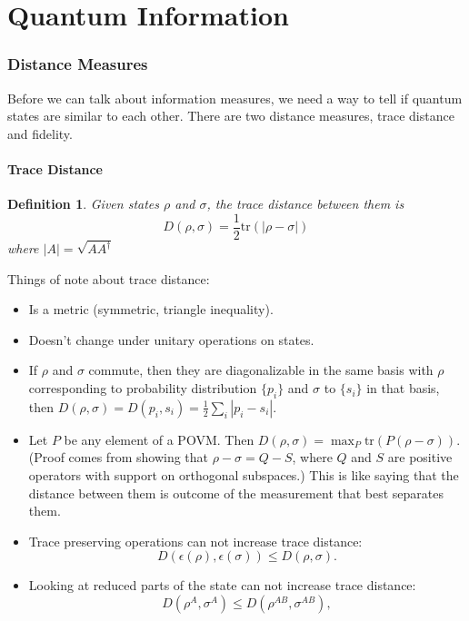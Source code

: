 \documentclass[12pt]{article}
\newtheorem{define}[theorem]{Definition}
\begin{document}
\part{Quantum Information}
\setcounter{section}{0}
\section{Distance Measures}
Before we can talk about information measures, we need a way to tell if quantum states are similar to each other. There are two distance measures, 
trace distance and fidelity.

\subsection{Trace Distance}
\begin{define} Given states $\rho$ and $\sigma$, the trace distance between them is
$$ D(\rho,\sigma)=\frac{1}{2}\text{tr}(|\rho-\sigma|)$$
where $|A|=\sqrt{AA^\dagger}$
\end{define}
Things of note about trace distance:
\begin{itemize}
\item Is a metric (symmetric, triangle inequality).
\item Doesn't change under unitary operations on states.
\item If $\rho$ and $\sigma$ commute, then they are diagonalizable in the same basis with $\rho$ corresponding to probability 
distribution $\{p_i\}$ and $\sigma$ to $\{s_i\}$ in that basis, then $D(\rho,\sigma)=D(p_i,s_i)=\frac{1}{2}\sum_i|p_i-s_i|.$
\item Let $P$ be any element of a POVM. Then $D(\rho,\sigma)=\max_P\text{tr}(P(\rho-\sigma)).$ 
(Proof comes from showing that $\rho-\sigma=Q-S$, where $Q$ and $S$ are positive operators 
with support on orthogonal subspaces.) This is like saying that the distance between them is outcome of 
the measurement that best separates them. 
\item Trace preserving operations can not increase trace distance:
$$D(\epsilon(\rho),\epsilon(\sigma))\leq D(\rho,\sigma).$$
\item Looking at reduced parts of the state can not increase trace distance:
$$D(\rho^A,\sigma^A)\leq D(\rho^{AB},\sigma^{AB}),$$ 
\end{itemize}
\end{document}
